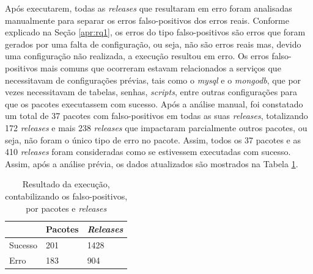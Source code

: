 Após executarem, todas as \textit{releases} que resultaram em erro foram analisadas manualmente para separar os erros falso-positivos dos erros reais. Conforme explicado na Seção \ref{apr:rq1}, os erros do tipo falso-positivos são erros que foram gerados por uma falta de configuração, ou seja, não são erros reais mas, devido uma configuração não realizada, a execução resultou em erro. Os erros falso-positivos mais comuns que ocorreram estavam relacionados a serviços que necessitavam de configurações prévias, tais como o \textit{mysql} e o \textit{mongodb}, que por vezes necessitavam de tabelas, senhas, \textit{scripts}, entre outras configurações para que os pacotes executassem com sucesso. Após a análise manual, foi constatado um total de 37 pacotes com falso-positivos em todas as suas \textit{releases}, totalizando 172 \textit{releases} e mais 238 \textit{releases} que impactaram parcialmente outros pacotes, ou seja, não foram o único tipo de erro no pacote. Assim, todos os 37 pacotes e as 410 \textit{releases} foram consideradas como se estivessem executadas com sucesso. Assim, após a análise prévia, os dados atualizados são mostrados na Tabela \ref{tab:res_rq1_2}.

\begin{table}[]
\centering
\begin{tabular}{|l|l|l|}
\hline
                    & Pacotes & \textit{Releases} \\ \hline
    Sucesso         & 201     & 1428     \\
    Erro            & 183     & 904     \\ \hline
\end{tabular}
\caption{Resultado da execução, contabilizando os falso-positivos, por pacotes e \textit{releases}}
\label{tab:res_rq1_2}
\end{table}

